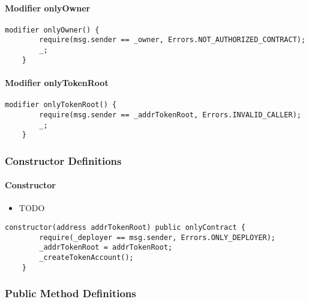 \paragraph{Modifier onlyOwner}


\begin{lstlisting}[firstnumber=34]
    modifier onlyOwner() {
        require(msg.sender == _owner, Errors.NOT_AUTHORIZED_CONTRACT);
        _;
    }
\end{lstlisting}

\paragraph{Modifier onlyTokenRoot}


\begin{lstlisting}[firstnumber=39]
    modifier onlyTokenRoot() {
        require(msg.sender == _addrTokenRoot, Errors.INVALID_CALLER);
        _;
    }
\end{lstlisting}

\subsubsection{Constructor Definitions}


\paragraph{Constructor}

\begin{itemize}
\item TODO
\end{itemize}

\begin{lstlisting}[firstnumber=46]
    constructor(address addrTokenRoot) public onlyContract {
        require(_deployer == msg.sender, Errors.ONLY_DEPLOYER);
        _addrTokenRoot = addrTokenRoot;
        _createTokenAccount();
    }
\end{lstlisting}

\subsubsection{Public Method Definitions}


